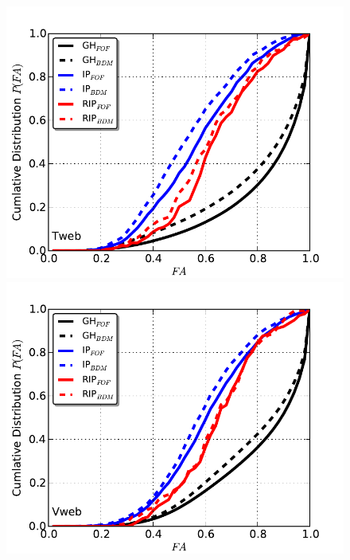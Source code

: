 \documentclass[a4,useAMS,usenatbib,usegraphicx]{latex/mn2e}
\begin{document}
\begin{flushleft}
\begin{figure}
\begin{center}

  \includegraphics[trim = 0mm 0mm 0mm 0mm, clip, keepaspectratio=true,
  width=0.3\textheight]{./figures/fractional_anisotrpy_Tweb}
  \includegraphics[trim = 0mm 0mm 0mm 0mm, clip, keepaspectratio=true,
  width=0.3\textheight]{./figures/fractional_anisotrpy_Vweb}
  

\end{center}
\end{figure}
\end{flushleft}
\end{document}
